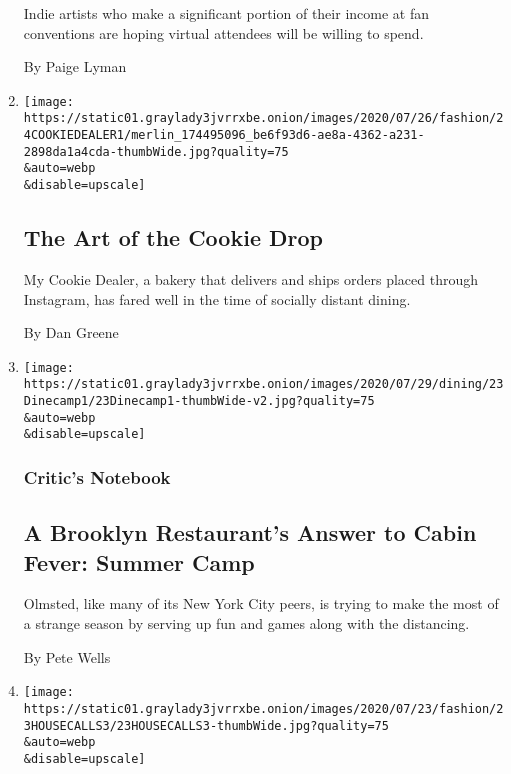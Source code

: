 \begin{enumerate}
  Indie artists who make a significant portion of their income at fan
  conventions are hoping virtual attendees will be willing to spend.

  By Paige Lyman
\item
  \href{/2020/07/24/style/my-cookie-dealer-instagram.html}{}

  \texttt{[image: https://static01.graylady3jvrrxbe.onion/images/2020/07/26/fashion/24COOKIEDEALER1/merlin\_174495096\_be6f93d6-ae8a-4362-a231-2898da1a4cda-thumbWide.jpg?quality=75\\\&auto=webp\\\&disable=upscale]}

  \hypertarget{the-art-of-the-cookie-drop}{%
  \subsection{The Art of the Cookie
  Drop}\label{the-art-of-the-cookie-drop}}

  My Cookie Dealer, a bakery that delivers and ships orders placed
  through Instagram, has fared well in the time of socially distant
  dining.

  By Dan Greene
\item
  \href{/2020/07/23/dining/outdoor-dining-olmsted-summer-camp.html}{}

  \texttt{[image: https://static01.graylady3jvrrxbe.onion/images/2020/07/29/dining/23Dinecamp1/23Dinecamp1-thumbWide-v2.jpg?quality=75\\\&auto=webp\\\&disable=upscale]}

  \hypertarget{critics-notebook-2}{%
  \subsubsection{Critic's Notebook}\label{critics-notebook-2}}

  \hypertarget{a-brooklyn-restaurants-answer-to-cabin-fever-summer-camp}{%
  \subsection{A Brooklyn Restaurant's Answer to Cabin Fever: Summer
  Camp}\label{a-brooklyn-restaurants-answer-to-cabin-fever-summer-camp}}

  Olmsted, like many of its New York City peers, is trying to make the
  most of a strange season by serving up fun and games along with the
  distancing.

  By Pete Wells
\item
  \href{/2020/07/23/style/coronavirus-manicures-haircuts-tattoos-dog-groomer-at-home.html}{}

  \texttt{[image: https://static01.graylady3jvrrxbe.onion/images/2020/07/23/fashion/23HOUSECALLS3/23HOUSECALLS3-thumbWide.jpg?quality=75\\\&auto=webp\\\&disable=upscale]}


\end{enumerate}
